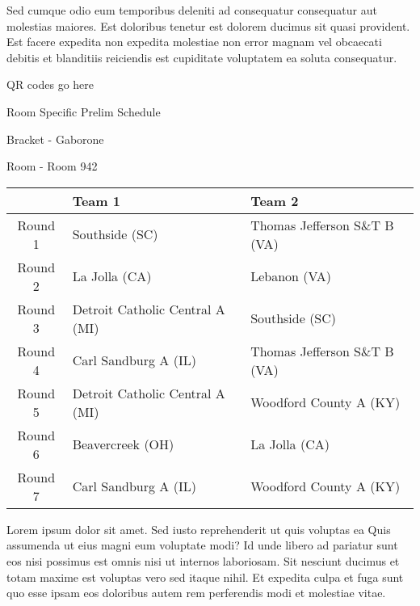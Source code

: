 \documentclass{article}%
\begin{document}
\newline%
Sed cumque odio eum temporibus deleniti ad consequatur consequatur aut molestias maiores. Est doloribus tenetur est dolorem ducimus sit quasi provident. Est facere expedita non expedita molestiae non error magnam vel obcaecati debitis et blanditiis reiciendis est cupiditate voluptatem ea soluta consequatur.%
\vspace*{140pt}%
\begin{center}%
\begin{Huge}%
QR codes go here%
\end{Huge}%
\end{center}%
\newpage%
\begin{center}%
\begin{Huge}%
Room Specific Prelim Schedule%
\end{Huge}%
\vspace*{8pt}%
\linebreak%
\begin{Large}%
Bracket {-} Gaborone%
\end{Large}%
\vspace*{8pt}%
\linebreak%
\vspace*{8pt}%
\begin{Large}%
Room {-} Room 942%
\end{Large}%
\end{center}%
%
\begin{tabularx}{\textwidth}{|c|Y|Y|}%
\hline%
&Team 1&Team 2\\%
\hline%
Round 1&Southside (SC)&Thomas Jefferson S\&T B (VA)\\%
Round 2&La Jolla (CA)&Lebanon (VA)\\%
Round 3&Detroit Catholic Central A (MI)&Southside (SC)\\%
Round 4&Carl Sandburg A (IL)&Thomas Jefferson S\&T B (VA)\\%
Round 5&Detroit Catholic Central A (MI)&Woodford County A (KY)\\%
Round 6&Beavercreek (OH)&La Jolla (CA)\\%
Round 7&Carl Sandburg A (IL)&Woodford County A (KY)\\%
\hline%
\end{tabularx}%
\vspace*{8pt}%
\newline%
Lorem ipsum dolor sit amet. Sed iusto reprehenderit ut quis voluptas ea Quis assumenda ut eius magni eum voluptate modi? Id unde libero ad pariatur sunt eos nisi possimus est omnis nisi ut internos laboriosam. Sit nesciunt ducimus et totam maxime est voluptas vero sed itaque nihil. Et expedita culpa et fuga sunt quo esse ipsam eos doloribus autem rem perferendis modi et molestiae vitae.\newline%
\end{document}

